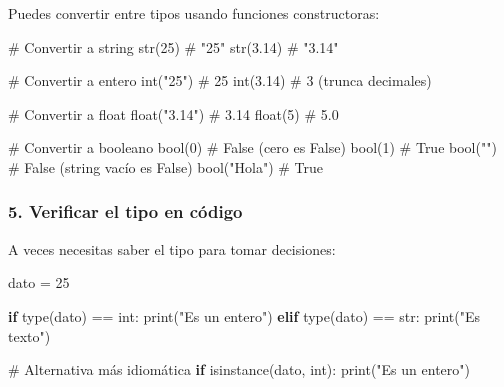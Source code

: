 \documentclass[
  doc,
  floatsintext,
  longtable,
  a4paper,
  nolmodern,
  notxfonts,
  notimes,
  12pt,
  colorlinks=true,linkcolor=blue,citecolor=blue,urlcolor=blue]{apa7}
\newenvironment{Shaded}{\begin{snugshade}}{\end{snugshade}}
\newcommand{\BuiltInTok}[1]{\textcolor[rgb]{0.00,0.23,0.31}{#1}}
\newcommand{\CommentTok}[1]{\textcolor[rgb]{0.37,0.37,0.37}{#1}}
\newcommand{\ControlFlowTok}[1]{\textcolor[rgb]{0.00,0.23,0.31}{\textbf{#1}}}
\newcommand{\DecValTok}[1]{\textcolor[rgb]{0.68,0.00,0.00}{#1}}
\newcommand{\FloatTok}[1]{\textcolor[rgb]{0.68,0.00,0.00}{#1}}
\newcommand{\NormalTok}[1]{\textcolor[rgb]{0.00,0.23,0.31}{#1}}
\newcommand{\OperatorTok}[1]{\textcolor[rgb]{0.37,0.37,0.37}{#1}}
\newcommand{\StringTok}[1]{\textcolor[rgb]{0.13,0.47,0.30}{#1}}
\begin{document}
Puedes convertir entre tipos usando funciones constructoras:

\begin{Shaded}
\begin{Highlighting}[]
\CommentTok{\# Convertir a string}
\BuiltInTok{str}\NormalTok{(}\DecValTok{25}\NormalTok{)        }\CommentTok{\# "25"}
\BuiltInTok{str}\NormalTok{(}\FloatTok{3.14}\NormalTok{)      }\CommentTok{\# "3.14"}

\CommentTok{\# Convertir a entero}
\BuiltInTok{int}\NormalTok{(}\StringTok{"25"}\NormalTok{)      }\CommentTok{\# 25}
\BuiltInTok{int}\NormalTok{(}\FloatTok{3.14}\NormalTok{)      }\CommentTok{\# 3 (trunca decimales)}

\CommentTok{\# Convertir a float}
\BuiltInTok{float}\NormalTok{(}\StringTok{"3.14"}\NormalTok{)  }\CommentTok{\# 3.14}
\BuiltInTok{float}\NormalTok{(}\DecValTok{5}\NormalTok{)       }\CommentTok{\# 5.0}

\CommentTok{\# Convertir a booleano}
\BuiltInTok{bool}\NormalTok{(}\DecValTok{0}\NormalTok{)        }\CommentTok{\# False (cero es False)}
\BuiltInTok{bool}\NormalTok{(}\DecValTok{1}\NormalTok{)        }\CommentTok{\# True}
\BuiltInTok{bool}\NormalTok{(}\StringTok{""}\NormalTok{)       }\CommentTok{\# False (string vacío es False)}
\BuiltInTok{bool}\NormalTok{(}\StringTok{"Hola"}\NormalTok{)   }\CommentTok{\# True}
\end{Highlighting}
\end{Shaded}

\subsubsection{5. Verificar el tipo en
código}\label{verificar-el-tipo-en-cuxf3digo}

A veces necesitas saber el tipo para tomar decisiones:

\begin{Shaded}
\begin{Highlighting}[]
\NormalTok{dato }\OperatorTok{=} \DecValTok{25}

\ControlFlowTok{if} \BuiltInTok{type}\NormalTok{(dato) }\OperatorTok{==} \BuiltInTok{int}\NormalTok{:}
    \BuiltInTok{print}\NormalTok{(}\StringTok{"Es un entero"}\NormalTok{)}
\ControlFlowTok{elif} \BuiltInTok{type}\NormalTok{(dato) }\OperatorTok{==} \BuiltInTok{str}\NormalTok{:}
    \BuiltInTok{print}\NormalTok{(}\StringTok{"Es texto"}\NormalTok{)}

\CommentTok{\# Alternativa más idiomática}
\ControlFlowTok{if} \BuiltInTok{isinstance}\NormalTok{(dato, }\BuiltInTok{int}\NormalTok{):}
    \BuiltInTok{print}\NormalTok{(}\StringTok{"Es un entero"}\NormalTok{)}
\end{Highlighting}
\end{Shaded}
\end{document}
